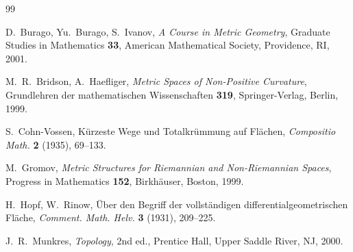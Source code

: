 \documentclass[12pt, a4paper]{amsart}
\theoremstyle{definition}
\theoremstyle{remark}
\begin{document}
\begin{thebibliography}{99}

 D.~Burago, Yu.~Burago, S.~Ivanov, \emph{A Course in Metric Geometry}, Graduate Studies in Mathematics \textbf{33}, American Mathematical Society, Providence, RI, 2001.

 M.~R.~Bridson, A.~Haefliger, \emph{Metric Spaces of Non-Positive Curvature}, Grundlehren der mathematischen Wissenschaften \textbf{319}, Springer-Verlag, Berlin, 1999.

 S.~Cohn-Vossen, Kürzeste Wege und Totalkrümmung auf Flächen, \emph{Compositio Math.} \textbf{2} (1935), 69--133.

 M.~Gromov, \emph{Metric Structures for Riemannian and Non-Riemannian Spaces}, Progress in Mathematics \textbf{152}, Birkhäuser, Boston, 1999.

 H.~Hopf, W.~Rinow, Über den Begriff der vollständigen differentialgeometrischen Fläche, \emph{Comment. Math. Helv.} \textbf{3} (1931), 209--225.

 J.~R.~Munkres, \emph{Topology}, 2nd ed., Prentice Hall, Upper Saddle River, NJ, 2000.

\end{thebibliography}
\end{document}
